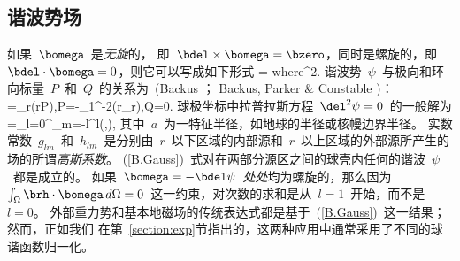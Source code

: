 \subsection{谐波势场}
%

如果~$\bomega$~是{\em 无旋\/}的，
%
%
即~$\bdel\times\bomega=\bzero$，同时是螺旋的，即~
$\bdel\cdot\bomega=0$，则它可以写成如下形式
\eq \label{B.last}
\bomega=-\bdel\psi\quad\mbox{where}\quad\del^2.
\en
谐波势~$\psi$~与极向和环向标量~$P$~和~$Q$~的关系为~(Backus \citeyear{backus86}；
Backus, Parker \& Constable \citeyear{backus&al96})：
\eq
\psi=\p_r(rP),\qquad P=-\del_1^{-2}(r\p_r\psi),\qquad Q=0.
\en
球极坐标中拉普拉斯方程~$\del^2\psi=0$~的一般解为
\eq \label{B.Gauss}
\psi=\sum_{l=0}^{\infty}\sum_{m=-l}^l\left[g_{lm}
(a/r)^{l+1}+h_{lm}(r/a)^l\right]\ylm(\theta,\phi),
\en
其中~$a$~为一特征半径，如地球的半径或核幔边界半径。
实数常数~$g_{lm}$~和~$h_{lm}$~是分别由~$r$~以下区域的内部源和~$r$~以上区域的外部源所产生的场的所谓{\em 高斯系数\/}。
%
(\ref{B.Gauss})~式对在两部分源区之间的球壳内任何的谐波~$\psi$~都是成立的。
如果~$\bomega=-\bdel\psi$~{\em 处处\/}均为螺旋的，那么因为~$\int_{\Omega}\brh\cdot\bomega\,d\/\Omega=0$~这一约束，对次数的求和是从~$l=1$~开始，而不是~$l=0$。
外部重力势和基本地磁场的传统表达式都是基于~(\ref{B.Gauss})~这一结果；然而，正如我们
在第~\ref{section:exp}节指出的，这两种应用中通常采用了不同的球谐函数归一化。
%
%
%